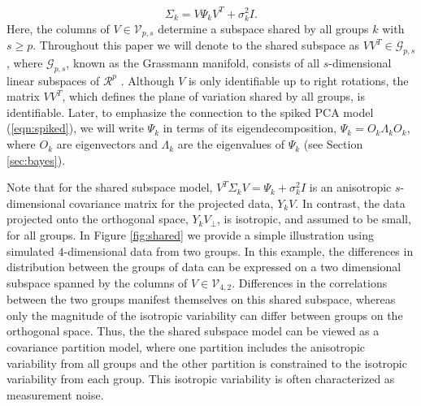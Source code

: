 \documentclass[12pt]{article}
\begin{document}
\begin{equation}
\Sigma_k = V\Psi_kV^T + \sigma^2_kI.
\label{eqn:sspsi}
\end{equation}
%
\noindent Here, the columns of $V \in \mathcal{V}_{p, s}$ determine a subspace
shared by all groups $k$ with $s \geq p$.  Throughout this paper we
will denote to the shared subspace as $VV^T \in \mathcal G_{p,s}$, where
$\mathcal G_{p,s}$, known as the Grassmann manifold, consists of all
$s$-dimensional linear subspaces of $\mathcal{R}^p$
\citep{Chikuse2012}.  Although $V$ is only identifiable up to right
rotations, the matrix $VV^T$, which defines the plane of variation shared by all
groups, is identifiable.  Later, to emphasize the connection to the
spiked PCA model (\ref{eqn:spiked}), we will write $\Psi_k$ in terms
of its eigendecomposition, $\Psi_k = O_k\Lambda_kO_k$, where $O_k$ are
eigenvectors and $\Lambda_k$ are the eigenvalues of $\Psi_k$ (see
Section \ref{sec:bayes}).

Note that for the shared subspace model,
$V^T\Sigma_kV = \Psi_k + \sigma_k^2I$ is an anisotropic
$s$-dimensional covariance matrix for the projected data, $Y_kV$.
In contrast, the data projected onto the orthogonal space,
$Y_kV_{\perp}$, is isotropic, and assumed to be small, for all
groups.  In Figure \ref{fig:shared} we provide a simple illustration
using simulated $4$-dimensional data from two groups.  In this example, the
differences in distribution between the groups of data can be
expressed on a two dimensional subspace spanned by the columns of
$V \in \mathcal{V}_{4, 2}$.  Differences in the correlations between
the two groups manifest themselves on this shared subspace, whereas
only the magnitude of the isotropic variability can differ between groups
on the orthogonal space.  Thus, the the shared subspace model can be
viewed as a covariance partition model, where one partition includes
the anisotropic variability from all groups and the other partition is
constrained to the isotropic variability from each group.  This
isotropic variability is often characterized as measurement noise.



\end{document}

